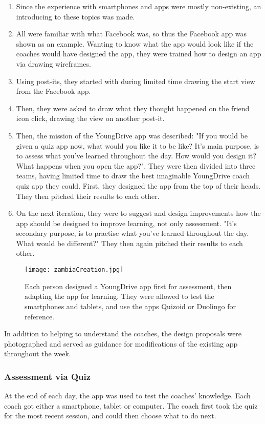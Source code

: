 \begin{enumerate}
\item Since the experience with smartphones and apps were mostly non-existing, an introducing to these topics was made.
\item All were familiar with what Facebook was, so thus the Facebook app was shown as an example. Wanting to know what the app would look like if the coaches would have designed the app, they were trained how to design an app via drawing wireframes.
\item Using post-its, they started with during limited time drawing the start view from the Facebook app.
\item Then, they were asked to draw what they thought happened on the friend icon click, drawing the view on another post-it.
\item Then, the mission of the YoungDrive app was described: "If you would be given a quiz app now, what would you like it to be like? It’s main purpose, is to assess what you’ve learned throughout the day. How would you design it? What happens when you open the app?". They were then divided into three teams, having limited time to draw the best imaginable YoungDrive coach quiz app they could. First, they designed the app from the top of their heads. They then pitched their results to each other.
\item On the next iteration, they were to suggest and design improvements how the app should be designed to improve learning, not only assessment. "It’s secondary purpose, is to practise what you’ve learned throughout the day. What would be different?" They then again pitched their results to each other.
\end{enumerate}

\begin{figure}[h]
    \centering
    \texttt{[image: zambiaCreation.jpg]}
    \caption{Each person designed a YoungDrive app first for assessment, then adapting the app for learning. They were allowed to test the smartphones and tablets, and use the apps Quizoid or Duolingo for reference.}
    \label{fig:zambia}
\end{figure}

In addition to helping to understand the coaches, the design proposals were photographed and served as guidance for modifications of the existing app throughout the week.

\subsubsection{Assessment via Quiz}
At the end of each day, the app was used to test the coaches' knowledge. Each coach got either a smartphone, tablet or computer. The coach first took the quiz for the most recent session, and could then choose what to do next.

